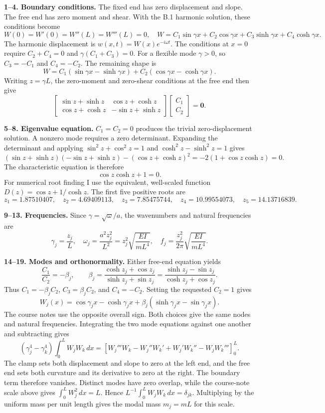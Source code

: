 \textbf{1--4. Boundary conditions.} The fixed end has zero displacement and slope. The free end has zero moment and shear. With the B.1 harmonic solution, these conditions become
\[
W(0)=W'(0)=W''(L)=W'''(L)=0,\quad
W=C_1\sin\gamma x+C_2\cos\gamma x+C_3\sinh\gamma x+C_4\cosh\gamma x.
\]
The harmonic displacement is $w(x,t)=W(x)e^{-i\omega t}$. The conditions at $x=0$ require $C_2+C_4=0$ and $\gamma(C_1+C_3)=0$. For a flexible mode $\gamma>0$, so $C_3=-C_1$ and $C_4=-C_2$. The remaining shape is
\[
W=C_1(\sin\gamma x-\sinh\gamma x)+C_2(\cos\gamma x-\cosh\gamma x).
\]
Writing $z=\gamma L$, the zero-moment and zero-shear conditions at the free end then give
\[
\begin{bmatrix}
\sin z+\sinh z & \cos z+\cosh z\\
\cos z+\cosh z & -\sin z+\sinh z
\end{bmatrix}
\begin{bmatrix}C_1\\C_2\end{bmatrix}=\mathbf0.
\]

\textbf{5--8. Eigenvalue equation.} $C_1=C_2=0$ produces the trivial zero-displacement solution. A nonzero mode requires a zero determinant. Expanding the determinant and applying $\sin^2z+\cos^2z=1$ and $\cosh^2z-\sinh^2z=1$ gives
\[
(\sin z+\sinh z)(-\sin z+\sinh z)-(\cos z+\cosh z)^2
=-2(1+\cos z\cosh z)=0.
\]
The characteristic equation is therefore
\[
\boxed{\cos z\cosh z+1=0.}
\]
For numerical root finding I use the equivalent, well-scaled function $D(z)=\cos z+1/\cosh z$. The first five positive roots are
\[
\boxed{z_1=1.87510407,\quad z_2=4.69409113,\quad z_3=7.85475744,\quad z_4=10.99554073,\quad z_5=14.13716839.}
\]

\textbf{9--13. Frequencies.} Since $\gamma=\sqrt\omega/a$, the wavenumbers and natural frequencies are
\[
\boxed{\gamma_j=\frac{z_j}{L},\quad
\omega_j=\frac{a^2z_j^2}{L^2}
=z_j^2\sqrt{\frac{EI}{mL^4}},\quad
f_j=\frac{z_j^2}{2\pi}\sqrt{\frac{EI}{mL^4}}.}
\]

\textbf{14--19. Modes and orthonormality.} Either free-end equation yields
\[
\frac{C_1}{C_2}=-\beta_j,\qquad
\beta_j=\frac{\cosh z_j+\cos z_j}{\sinh z_j+\sin z_j}
=\frac{\sinh z_j-\sin z_j}{\cosh z_j+\cos z_j}.
\]
Thus $C_1=-\beta_j C_2$, $C_3=\beta_j C_2$, and $C_4=-C_2$. Setting the requested $C_2=1$ gives
\[
\boxed{W_j(x)=\cos\gamma_jx-\cosh\gamma_jx
+\beta_j(\sinh\gamma_jx-\sin\gamma_jx).}
\]
The course notes use the opposite overall sign. Both choices give the same nodes and natural frequencies. Integrating the two mode equations against one another and subtracting gives
\[
(\gamma_j^4-\gamma_k^4)\int_0^L W_jW_k\,dx
=\left[W_j'''W_k-W_j''W_k'+W_j'W_k''-W_jW_k'''\right]_0^L.
\]
The clamp sets both displacement and slope to zero at the left end, and the free end sets both curvature and its derivative to zero at the right. The boundary term therefore vanishes. Distinct modes have zero overlap, while the course-note scale above gives $\int_0^L W_j^2\,dx=L$. Hence $L^{-1}\int_0^L W_jW_k\,dx=\delta_{jk}$. Multiplying by the uniform mass per unit length gives the modal mass $m_j=mL$ for this scale.


